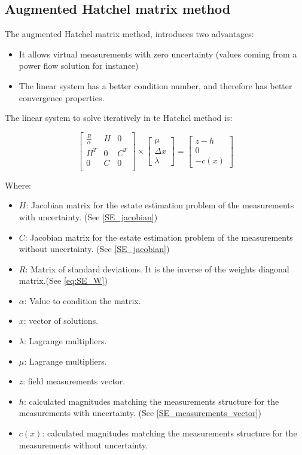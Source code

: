 \documentclass[a4paper,twoside,fleqn]{tufte-book}
\begin{document}
\subsection{Augmented Hatchel matrix method}

The augmented Hatchel matrix method, introduces two advantages: 
\begin{itemize}
	\item It allows virtual measurements with zero uncertainty (values coming from a power flow solution for instance)
	\item The linear system has a better condition number, and therefore has better convergence properties.
\end{itemize}

The linear system to solve iteratively in te Hatchel method is:

\begin{equation}
\begin{bmatrix}
\frac{R}{\alpha} & H & 0 \\
H^T & 0 & C^T \\
0 & C & 0 \\
\end{bmatrix}
\times
\begin{bmatrix}
\mu\\
\Delta x\\
\lambda
\end{bmatrix}
=
\begin{bmatrix}
z-h\\
0\\
-c(x)
\end{bmatrix}
\end{equation}

Where:

\begin{itemize}
	\item $H$: Jacobian matrix for the estate estimation problem of the measurements with uncertainty. (See \ref{SE_jacobian})
	\item $C$: Jacobian matrix for the estate estimation problem of the measurements without uncertainty. (See \ref{SE_jacobian})
	\item $R$: Matrix of standard deviations. It is the inverse of the weights diagonal matrix.(See \ref{eq:SE_W})
	\item $\alpha$: Value to condition the matrix. 
	\item $x$: vector of solutions.
	\item $\lambda$: Lagrange multipliers.
	\item $\mu$: Lagrange multipliers.
	\item $z$: field measurements vector.
	\item $h$: calculated magnitudes matching the measurements structure for the measurements with uncertainty. (See \ref{SE_measurements_vector})
	\item $c(x)$: calculated magnitudes matching the measurements structure for the measurements without uncertainty.
\end{itemize}
\end{document}
